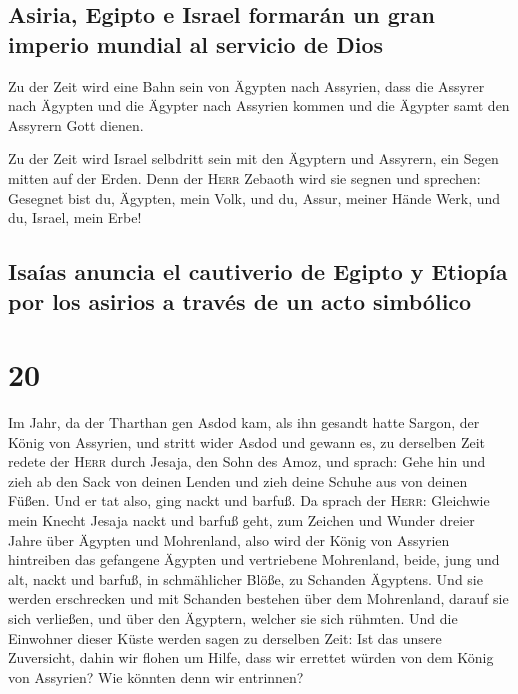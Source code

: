 \hypertarget{asiria-egipto-e-israel-formaruxe1n-un-gran-imperio-mundial-al-servicio-de-dios}{%
\subsection{Asiria, Egipto e Israel formarán un gran imperio mundial al
servicio de
Dios}\label{asiria-egipto-e-israel-formaruxe1n-un-gran-imperio-mundial-al-servicio-de-dios}}

 Zu der Zeit wird eine Bahn sein von Ägypten nach
Assyrien, dass die Assyrer nach Ägypten und die Ägypter nach Assyrien
kommen und die Ägypter samt den Assyrern Gott dienen.

 Zu der Zeit wird Israel selbdritt sein mit den Ägyptern
und Assyrern, ein Segen mitten auf der Erden.  Denn der
\textsc{Herr} Zebaoth wird sie segnen und sprechen: Gesegnet bist du,
Ägypten, mein Volk, und du, Assur, meiner Hände Werk, und du, Israel,
mein Erbe!

\hypertarget{isauxedas-anuncia-el-cautiverio-de-egipto-y-etiopuxeda-por-los-asirios-a-travuxe9s-de-un-acto-simbuxf3lico}{%
\subsection{Isaías anuncia el cautiverio de Egipto y Etiopía por los
asirios a través de un acto
simbólico}\label{isauxedas-anuncia-el-cautiverio-de-egipto-y-etiopuxeda-por-los-asirios-a-travuxe9s-de-un-acto-simbuxf3lico}}

\hypertarget{section-19}{%
\section{20}\label{section-19}}

 Im Jahr, da der Tharthan gen Asdod kam, als ihn gesandt
hatte Sargon, der König von Assyrien, und stritt wider Asdod und gewann
es,  zu derselben Zeit redete der \textsc{Herr} durch
Jesaja, den Sohn des Amoz, und sprach: Gehe hin und zieh ab den Sack von
deinen Lenden und zieh deine Schuhe aus von deinen Füßen. Und er tat
also, ging nackt und barfuß.  Da sprach der \textsc{Herr}:
Gleichwie mein Knecht Jesaja nackt und barfuß geht, zum Zeichen und
Wunder dreier Jahre über Ägypten und Mohrenland,  also
wird der König von Assyrien hintreiben das gefangene Ägypten und
vertriebene Mohrenland, beide, jung und alt, nackt und barfuß, in
schmählicher Blöße, zu Schanden Ägyptens.  Und sie werden
erschrecken und mit Schanden bestehen über dem Mohrenland, darauf sie
sich verließen, und über den Ägyptern, welcher sie sich rühmten.
 Und die Einwohner dieser Küste werden sagen zu derselben
Zeit: Ist das unsere Zuversicht, dahin wir flohen um Hilfe, dass wir
errettet würden von dem König von Assyrien? Wie könnten denn wir
entrinnen?

